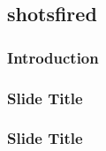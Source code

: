 \subsection{shotsfired}
\author{samiskin, d2lal, scmaier, wcakeize}

\begin{frame}
\frametitle{Introduction}

\end{frame}

\begin{frame}
\frametitle{Slide Title}

\end{frame}

\begin{frame}
\frametitle{Slide Title}

\end{frame}
